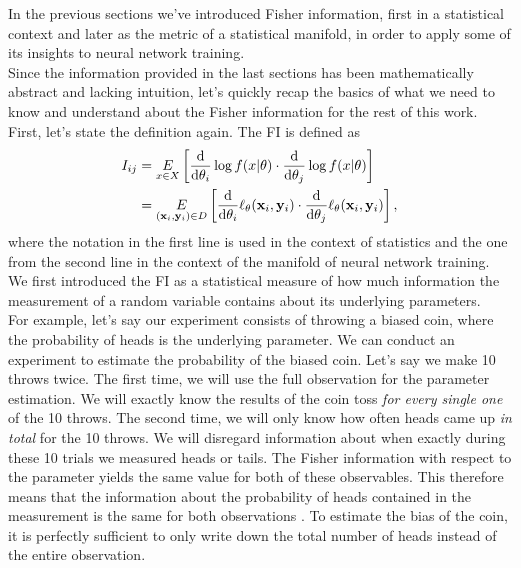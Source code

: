 In the previous sections we've introduced Fisher information, first in a statistical context and later as the metric of a statistical manifold, in order to apply some of its insights to neural network training.\\
Since the information provided in the last sections has been mathematically abstract and lacking intuition, let's quickly recap the basics of what we need to know and understand about the Fisher information for the rest of this work.\\
First, let's state the definition again. The FI is defined as 
\begin{equation}
	\begin{split}
		I_{ij} &= \underset{x \in X}{E} \left[\frac{\mathrm{d}}{\mathrm{d}\theta_i}\log f(x|\theta)\cdot \frac{\mathrm{d}}{\mathrm{d}\theta_j}\log f(x|\theta)\right]\\
		&= \underset{(\mathbf{x}_i,\mathbf{y}_i)\in D}{E} \left[\frac{\mathrm{d}}{\mathrm{d}\theta_i}\ell_\theta(\mathbf{x}_i,\mathbf{y}_i)\cdot \frac{\mathrm{d}}{\mathrm{d}\theta_j}\ell_\theta(\mathbf{x}_i,\mathbf{y}_i)\right],
	\end{split}
\end{equation}
where the notation in the first line is used in the context of statistics and the one from the second line in the context of the manifold of neural network training.\\
We first introduced the FI as a statistical measure of how much information the measurement of a random variable contains about its underlying parameters.\\
For example, let's say our experiment consists of throwing a biased coin, where the probability of heads is the underlying parameter. We can conduct an experiment to estimate the probability of the biased coin. Let's say we make 10 throws twice. The first time, we will use the full observation for the parameter estimation. We will exactly know the results of the coin toss \emph{for every single one} of the 10 throws. The second time, we will only know how often heads came up \emph{in total} for the 10 throws. We will disregard information about when exactly during these 10 trials we measured heads or tails. The Fisher information with respect to the parameter yields the same value for both of these observables. This therefore means that the information about the probability of heads contained in the measurement is the same for both observations \cite{StatisticFisherInfoTutorial}. To estimate the bias of the coin, it is perfectly sufficient to only write down the total number of heads instead of the entire observation.\\

